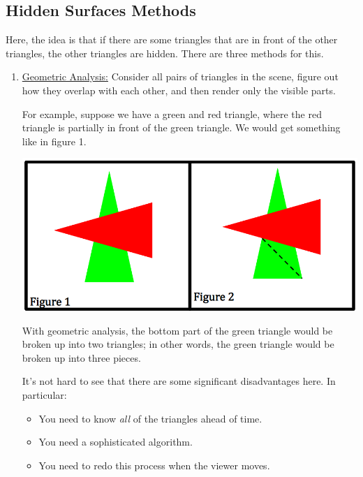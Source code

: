 \documentclass[letterpaper]{article}
\begin{document}
\subsection{Hidden Surfaces Methods}
Here, the idea is that if there are some triangles that are in front of the other triangles, the other triangles are hidden. There are three methods for this. 
\begin{enumerate}
    \item \underline{Geometric Analysis:} Consider all pairs of triangles in the scene, figure out how they overlap with each other, and then render only the visible parts.  
    
    \bigskip 

    For example, suppose we have a green and red triangle, where the red triangle is partially in front of the green triangle. We would get something like in figure 1.
    \begin{center}
        \includegraphics[scale=0.5]{../assets/hidden1.png}
    \end{center}
    With geometric analysis, the bottom part of the green triangle would be broken up into two triangles; in other words, the green triangle would be broken up into three pieces. 

    \bigskip 

    It's not hard to see that there are some significant disadvantages here. In particular: 
    \begin{itemize}
        \item You need to know \emph{all} of the triangles ahead of time. 
        \item You need a sophisticated algorithm. 
        \item You need to redo this process when the viewer moves. 
    \end{itemize}



\end{enumerate}
\end{document}
